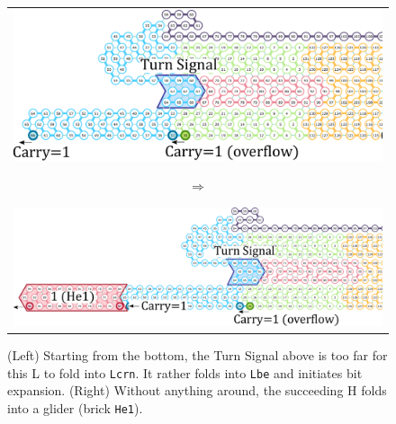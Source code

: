 \documentclass[twocolumn]{svjour3}
\begin{document}
\begin{figure}[tb]
\begin{tabular}{c}
 \begin{minipage}{0.4\linewidth}
\centering
\includegraphics[width=\linewidth]{fig/svg/CounterEx14_2.pdf}
\end{minipage}
\begin{minipage}{0.05\linewidth}
\centering
{\large $\Rightarrow$}
\end{minipage}
 \begin{minipage}{0.5\linewidth}
\centering
\includegraphics[width=\linewidth]{fig/svg/CounterEx15_2.pdf}
\end{minipage}
\end{tabular}

\caption{
(Left) Starting from the bottom, the Turn Signal above is too far for this L to fold into \texttt{Lcrn}.
It rather folds into \texttt{Lbe} and initiates bit expansion.
(Right) Without anything around, the succeeding H folds into a glider (brick \texttt{He1}).
}
\label{fig:overflowex2-3}
\end{figure}
\end{document}
